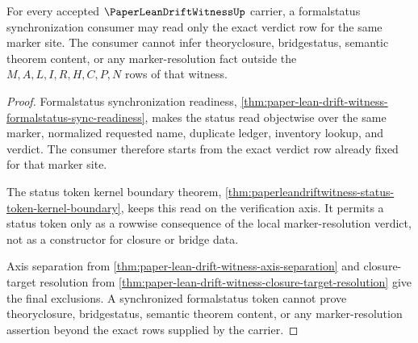 \begin{theorem}
\label{thm:paper-lean-drift-witness-status-consumer-exactness}
For every accepted $\PaperLeanDriftWitnessUp$ carrier, a formalstatus synchronization consumer may read only the exact verdict row for the same marker site. The consumer cannot infer theoryclosure, bridgestatus, semantic theorem content, or any marker-resolution fact outside the $M,A,L,I,R,H,C,P,N$ rows of that witness.
\end{theorem}
\begin{proof}
Formalstatus synchronization readiness, \autoref{thm:paper-lean-drift-witness-formalstatus-sync-readiness}, makes the status read objectwise over the same marker, normalized requested name, duplicate ledger, inventory lookup, and verdict. The consumer therefore starts from the exact verdict row already fixed for that marker site.

The status token kernel boundary theorem, \autoref{thm:paperleandriftwitness-status-token-kernel-boundary}, keeps this read on the verification axis. It permits a status token only as a rowwise consequence of the local marker-resolution verdict, not as a constructor for closure or bridge data.

Axis separation from \autoref{thm:paper-lean-drift-witness-axis-separation} and closure-target resolution from \autoref{thm:paper-lean-drift-witness-closure-target-resolution} give the final exclusions. A synchronized formalstatus token cannot prove theoryclosure, bridgestatus, semantic theorem content, or any marker-resolution assertion beyond the exact rows supplied by the carrier.
\end{proof}

